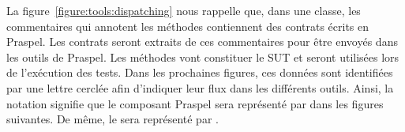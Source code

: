 La figure~\ref{figure:tools:dispatching} nous rappelle que, dans une classe, les
commentaires qui annotent les méthodes contiennent des contrats écrits en
Praspel. Les contrats seront extraits de ces commentaires pour être envoyés dans
les outils de Praspel. Les méthodes vont constituer le SUT et seront utilisées
lors de l'exécution des tests. Dans les prochaines figures, ces données sont
identifiées par une lettre cerclée afin d'indiquer leur flux dans les différents
outils. Ainsi, la notation %
signifie que le composant Praspel sera représenté par  dans les
figures suivantes. De même, le  sera représenté par
.

